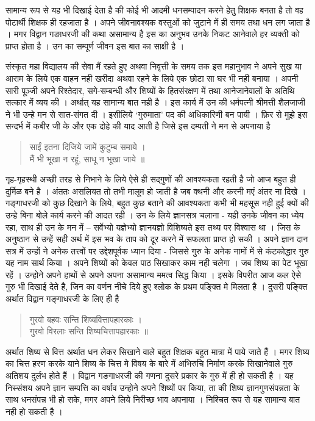 सामान्य रूप से यह भी दिखाई देता है की कोई भी आदमी धनसम्पादन करने हेतु शिक्षक बनता है तो वह पोटार्थी शिक्षक ही रहजाता है । अपने जीवनावश्यक वस्तुओं को जुटाने में ही समय तथा धन लग जाता है । मगर विद्वान गङाधरजी की कथा असामान्य है इस का अनुभव उनके निकट आनेवाले हर व्यक्ती को प्राप्त होता है । उन का सम्पूर्ण जीवन इस बात का साक्षी है ।

संस्कृत महा विद्यालय की सेवा मैं रहते हुए अथवा निवृत्ती के समय तक इस महानुभाव ने अपने सुख या आराम के लिये एक वाहन नही खरीदा अथवा रहने के लिये एक छोटा सा घर भी नही बनाया । अपनी सारी पूञ्जी अपने रिश्तेदार, सगे-सम्बन्धी और शिष्यों के हितसंरक्षण में तथा आनेजानेवालों के अतिथि सत्कार में व्यय की । अर्थात् यह सामान्य बात नही है । इस कार्य में उन की धर्मपत्नी श्रीमत्ती शैलजाजी ने भी उन्हे मन से सात-संगत दी । इसीलिये ‘गुरुमाता’ पद की अधिकारिणी बन पायी । फ़िर से मुझे इस सन्दर्भ में कबीर जी के और एक दोहे की याद आती है जिसे इस दम्पती ने मन से अपनाया है 
\begin{verse}
साईं इतना दिजिये जामें कुटुम्ब समाये ।\\
मैं भी भूखा न रहूं, साधू न भूखा जाये ॥
\end{verse}
गृह-गृहस्थी अच्छी तरह से निभाने के लिये ऐसे ही सद्गुणों की आवश्यकता रहती है जो आज बहुत ही दुर्मिळ बने है । अंततः असलियत तो तभी मालूम हो जाती है जब क्थनी और करनी मएं अंतर ना दिखे । गङ्गाधरजी को कुछ दिखाने के लिये, बहुत कुछ बताने की आवश्यकता कभी भी महसूस नही हुई क्यों की उन्हे बिना बोले कार्य करने की आदत रही । उन के लिये ज्ञानसत्र चलाना - यही उनके जीवन का ध्येय रहा, साथ ही उन के मन में -- सर्वेभ्यो यज्ञेभ्यो ज्ञानयज्ञो विशिष्यते इस तथ्य पर विश्वास था । जिस के अनुष्ठान से उन्हें सही अर्थ में इस भव के ताप को दूर करने में सफलता प्राप्त हो सकी । अपने ज्ञान दान सत्र में उन्हों ने अनेक तत्त्वों पर उद्देशपूर्वक ध्यान दिया - जिससे गुरु के अनेक नामों में से कंटकोद्धार गुरु यह नाम सार्थ किया । अपने शिष्यों को केवल पाठ सिखाकर काम नही चलेगा । जब शिष्य का पेट भूखा रहें । उन्होने अपने हाथों से अपने अपना असामान्य ममत्व सिद्ध किया । इसके विपरीत आज कल ऐसे गुरु भी दिखाई देते है, जिन का वर्णन नीचे दिये हुए श्लोक के प्रथम पङ्क्ति मे मिलता है । दुसरी पङ्क्ति अर्थात विद्वान गङ्गाधरजी के लिए ही है  
\begin{verse}
गुरवो बहवः सन्ति शिष्यवित्तापहारकाः ।\\
गुरवो विरलाः सन्ति शिष्यचित्तापहारकाः ॥
\end{verse}
अर्थात शिष्य से वित्त अर्थात धन लेकर सिखाने वाले बहुत शिक्षक बहुत मात्रा में पाये जाते हैं । मगर शिष्य का चित्त हरण  करके याने शिष्य के चित्त मे विषय के बारे में अभिरुचि निर्माण करके सिखानेवाले गुरु अतिशय दुर्लभ  होते हैं । विद्वान गङगाधरजी की गणना दुसरे प्रकार के गुरु में ही हो सकती है । यह निस्संशय अपने ज्ञान सम्पत्ति का वर्षाव उन्होने अपने शिष्यों पर किया, ता की शिष्य ज्ञानगुणसंपन्नता के साथ धनसंपन्न भी हो सके, मगर अपने लिये निरीच्छ भाव अपनाया । निश्चित रूप से यह सामान्य बात नही हो सकती है ।

